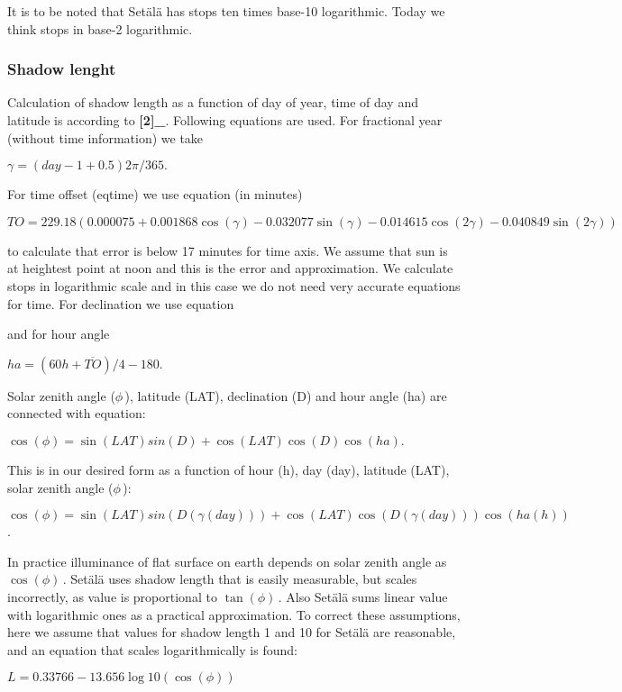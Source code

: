 \documentclass[a4paper,11pt,english]{sphinxmanual}
\begin{document}
It is to be noted that Setälä has stops ten times base-10 logarithmic.
Today we think stops in base-2 logarithmic.


\subsubsection{Shadow lenght}
\label{\detokenize{examples/examples:shadow-lenght}}
Calculation of shadow length as a function of day of year, time of day
and latitude is according to  {\color{red}\bfseries{}{[}2{]}\_}. Following equations are used. For
fractional year (without time information) we take

\(\gamma = (day-1+0.5)2\pi /365.\)

For time offset (eqtime) we use equation (in minutes)

\(TO = 229.18(0.000075+0.001868\cos(\gamma)-0.032077\sin(\gamma)-0.014615\cos(2\gamma)-0.040849\sin(2\gamma))\)

to calculate that error is below 17 minutes for time axis. We assume
that sun is at heightest point at noon and this is the error and
approximation. We calculate stops in logarithmic scale and in this case
we do not need very accurate equations for time. For declination we use
equation

and for hour angle

\(ha=(60h+\overline{TO})/4-180. \,\)

Solar zenith angle (\(\phi \,\)), latitude (LAT),
declination (D) and hour angle (ha) are connected with equation:

\(\cos (\phi ) = \sin(LAT)sin(D)+\cos(LAT)\cos(D)\cos(ha). \,\)

This is in our desired form as a function of hour (h), day (day),
latitude (LAT), solar zenith angle (\(\phi \,\)):

\(\cos (\phi ) = \sin(LAT)sin(D(\gamma(day)))+\cos(LAT)\cos(D(\gamma(day)))\cos(ha(h)) \,\).

In practice illuminance of flat surface on earth depends on solar zenith
angle as \(\cos(\phi)\,\). Setälä uses shadow length that is
easily measurable, but scales incorrectly, as value is proportional to
\(\tan(\phi)\,\). Also Setälä sums linear value with
logarithmic ones as a practical approximation. To correct these
assumptions, here we assume that values for shadow length 1 and 10 for Setälä
are reasonable, and an equation that scales logarithmically is found:

\(L = 0.33766 - 13.656 \log10 (\cos(\phi)) \,\)
\end{document}
